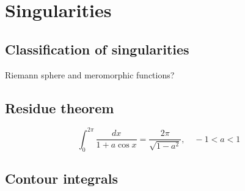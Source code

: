 \documentclass{../../large}
\begin{document}
\chapter{Singularities}

\section{Classification of singularities}
\begin{prb}
\end{prb}
\begin{prb}
\end{prb}
\begin{prb}
\end{prb}
\begin{prb}
\end{prb}
\begin{prb}
\end{prb}
Riemann sphere and meromorphic functions?

\section{Residue theorem}
\begin{prb}

\end{prb}


\begin{prb}
\[\int_0^{2\pi}\frac{dx}{1+a\cos x}=\frac{2\pi}{\sqrt{1-a^2}},\quad-1<a<1\]
\end{prb}



\section{Contour integrals}
\end{document}
